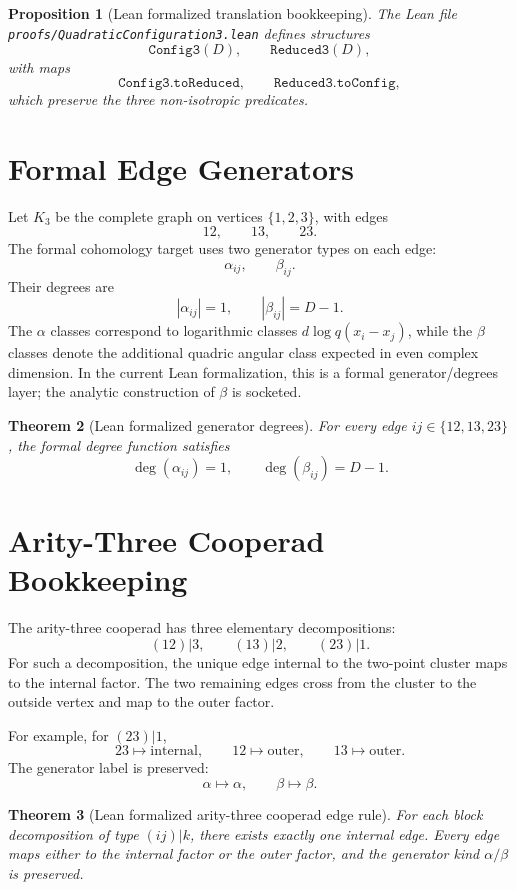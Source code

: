 \documentclass[11pt]{article}
\newtheorem{theorem}{Theorem}[section]
\newtheorem{proposition}[theorem]{Proposition}
\begin{document}
\begin{proposition}[Lean formalized translation bookkeeping]
The Lean file \texttt{proofs/QuadraticConfiguration3.lean} defines structures
\[
\texttt{Config3}(D),
\qquad
\texttt{Reduced3}(D),
\]
with maps
\[
\texttt{Config3.toReduced},
\qquad
\texttt{Reduced3.toConfig},
\]
which preserve the three non-isotropic predicates.
\end{proposition}

\section{Formal Edge Generators}
Let $K_3$ be the complete graph on vertices $\{1,2,3\}$, with edges
\[
12,
\qquad
13,
\qquad
23.
\]
The formal cohomology target uses two generator types on each edge:
\[
\alpha_{ij},
\qquad
\beta_{ij}.
\]
Their degrees are
\[
|\alpha_{ij}|=1,
\qquad
|\beta_{ij}|=D-1.
\]
The $\alpha$ classes correspond to logarithmic classes $d\log q(x_i-x_j)$, while the $\beta$ classes denote the additional quadric angular class expected in even complex dimension.  In the current Lean formalization, this is a formal generator/degrees layer; the analytic construction of $\beta$ is socketed.

\begin{theorem}[Lean formalized generator degrees]
For every edge $ij\in\{12,13,23\}$, the formal degree function satisfies
\[
\deg(\alpha_{ij})=1,
\qquad
\deg(\beta_{ij})=D-1.
\]
\end{theorem}

\section{Arity-Three Cooperad Bookkeeping}
The arity-three cooperad has three elementary decompositions:
\[
(12)|3,
\qquad
(13)|2,
\qquad
(23)|1.
\]
For such a decomposition, the unique edge internal to the two-point cluster maps to the internal factor.  The two remaining edges cross from the cluster to the outside vertex and map to the outer factor.

For example, for $(23)|1$,
\[
23\longmapsto \mathrm{internal},
\qquad
12\longmapsto \mathrm{outer},
\qquad
13\longmapsto \mathrm{outer}.
\]
The generator label is preserved:
\[
\alpha\mapsto\alpha,
\qquad
\beta\mapsto\beta.
\]

\begin{theorem}[Lean formalized arity-three cooperad edge rule]
For each block decomposition of type $(ij)|k$, there exists exactly one internal edge.  Every edge maps either to the internal factor or the outer factor, and the generator kind $\alpha/\beta$ is preserved.
\end{theorem}
\end{document}
